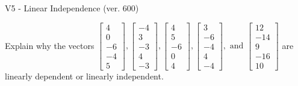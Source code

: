 \begin{exercise}
  \begin{exerciseTitle}V5 - Linear Independence (ver. 600)\end{exerciseTitle}
  \begin{exerciseStatement}
    Explain why the vectors \(\left[\begin{array}{r}
4 \\
0 \\
-6 \\
-4 \\
5
\end{array}\right] , \left[\begin{array}{r}
-4 \\
3 \\
-3 \\
4 \\
-3
\end{array}\right] , \left[\begin{array}{r}
4 \\
5 \\
-6 \\
0 \\
4
\end{array}\right] , \left[\begin{array}{r}
3 \\
-6 \\
-4 \\
4 \\
-4
\end{array}\right] , \text{ and } \left[\begin{array}{r}
12 \\
-14 \\
9 \\
-16 \\
10
\end{array}\right]\) are linearly dependent or linearly independent.	



\end{exerciseStatement}
\end{exercise}
